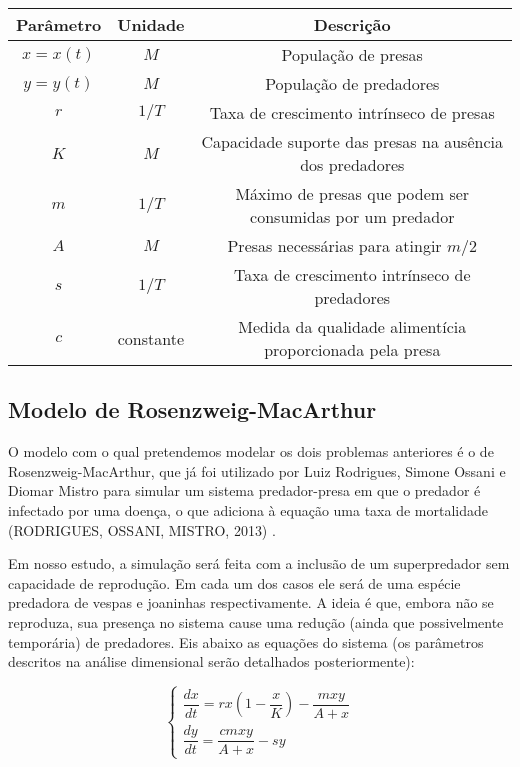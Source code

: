 \begin{center}
\begin{tabular}{| c | c | c |}
\hline
Parâmetro & Unidade & Descrição\\
\hline
$x=x(t)$ & $M$ & População de presas\\
$y=y(t)$ & $M$ & População de predadores\\
$r$ & $1/T$ & Taxa de crescimento intrínseco de presas\\
$K$ & $M$ & Capacidade suporte das presas na ausência dos predadores\\
$m$ & $1/T$ & Máximo de presas que podem ser consumidas por um predador\\
$A$ & $M$ & Presas necessárias para atingir $m/2$\\
$s$ & $1/T$ & Taxa de crescimento intrínseco de predadores\\
$c$ & constante & Medida da qualidade alimentícia proporcionada pela presa\\
\hline
\end{tabular}
\end{center}

\newpage

\subsection{Modelo de Rosenzweig-MacArthur}

O modelo com o qual pretendemos modelar os dois problemas anteriores é o de Rosenzweig-MacArthur, que já foi utilizado por Luiz Rodrigues, Simone Ossani e Diomar Mistro para simular um sistema predador-presa em que o predador é infectado por uma doença, o que adiciona à equação uma taxa de mortalidade (RODRIGUES, OSSANI, MISTRO, 2013) \cite{lr_so_dm_2013}. 

Em nosso estudo, a simulação será feita com a inclusão de um superpredador sem capacidade de reprodução. Em cada um dos casos ele será de uma espécie predadora de vespas e joaninhas respectivamente. A ideia é que, embora não se reproduza, sua presença no sistema cause uma redução (ainda que possivelmente temporária) de predadores. Eis abaixo as equações do sistema (os parâmetros descritos na análise dimensional serão detalhados posteriormente):

$$\left\{
\begin{array}{l}
\dfrac{dx}{dt}=rx\left(1-\dfrac{x}{K}\right)-\dfrac{mxy}{A+x}\\
\dfrac{dy}{dt}=\dfrac{cmxy}{A+x}-sy
\end{array}
\right.$$

